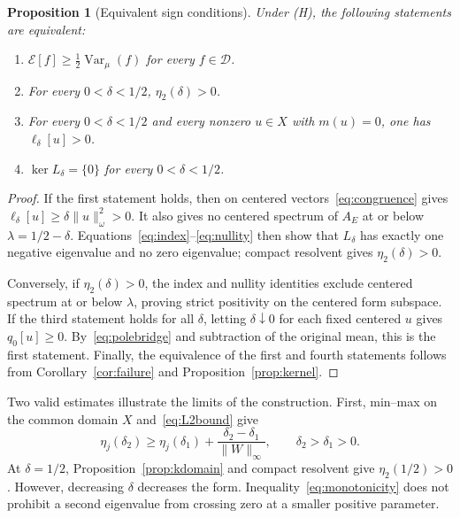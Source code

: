 \documentclass[11pt,a4paper]{article}
\numberwithin{equation}{section}
\newtheorem{proposition}[theorem]{Proposition}
\theoremstyle{definition}
\theoremstyle{remark}
\newcommand{\E}{\mathcal E}
\newcommand{\D}{\mathcal D}
\newcommand{\Var}{\operatorname{Var}}
\newcommand{\norm}[1]{\lVert #1\rVert}
\begin{document}
\begin{proposition}[Equivalent sign conditions]\label{prop:sign}
Under \textup{(H)}, the following statements are equivalent:
\begin{enumerate}
\item $\E[f]\ge\tfrac12\Var_\mu(f)$ for every $f\in\D$.
\item For every $0<\delta<1/2$, $\eta_2(\delta)>0$.
\item For every $0<\delta<1/2$ and every nonzero $u\in X$ with $m(u)=0$, one has $\ell_\delta[u]>0$.
\item $\ker L_\delta=\{0\}$ for every $0<\delta<1/2$.
\end{enumerate}
\end{proposition}
\begin{proof}
If the first statement holds, then on centered vectors~\eqref{eq:congruence} gives $\ell_\delta[u]\ge\delta\norm{u}_\omega^2>0$. It also gives no centered spectrum of $A_E$ at or below $\lambda=1/2-\delta$. Equations~\eqref{eq:index}--\eqref{eq:nullity} then show that $L_\delta$ has exactly one negative eigenvalue and no zero eigenvalue; compact resolvent gives $\eta_2(\delta)>0$.

Conversely, if $\eta_2(\delta)>0$, the index and nullity identities exclude centered spectrum at or below $\lambda$, proving strict positivity on the centered form subspace. If the third statement holds for all $\delta$, letting $\delta\downarrow0$ for each fixed centered $u$ gives $q_0[u]\ge0$. By~\eqref{eq:polebridge} and subtraction of the original mean, this is the first statement. Finally, the equivalence of the first and fourth statements follows from Corollary~\ref{cor:failure} and Proposition~\ref{prop:kernel}.
\end{proof}

Two valid estimates illustrate the limits of the construction. First, min--max on the common domain $X$ and~\eqref{eq:L2bound} give
\begin{equation}\label{eq:monotonicity}
 \eta_j(\delta_2)\ge\eta_j(\delta_1)
       +\frac{\delta_2-\delta_1}{\norm{W}_\infty},
       \qquad\delta_2>\delta_1>0.
\end{equation}
At $\delta=1/2$, Proposition~\ref{prop:kdomain} and compact resolvent give $\eta_2(1/2)>0$. However, decreasing $\delta$ decreases the form. Inequality~\eqref{eq:monotonicity} does not prohibit a second eigenvalue from crossing zero at a smaller positive parameter.
\end{document}
